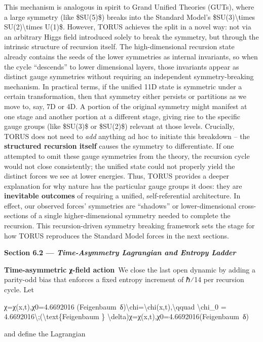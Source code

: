 This mechanism is analogous in spirit to Grand Unified Theories (GUTs),
where a large symmetry (like \$SU(5)\$) breaks into the Standard Model's
\$SU(3)\textbackslash{}times SU(2)\textbackslash{}times U(1)\$. However,
TORUS achieves the split in a novel way: not via an arbitrary Higgs
field introduced solely to break the symmetry, but through the intrinsic
structure of recursion itself​. The high-dimensional recursion state
already contains the seeds of the lower symmetries as internal
invariants, so when the cycle ``descends'' to lower dimensional layers,
those invariants appear as distinct gauge symmetries without requiring
an independent symmetry-breaking mechanism​. In practical terms, if the
unified 11D state is symmetric under a certain transformation, then that
symmetry either persists or partitions as we move to, say, 7D or 4D. A
portion of the original symmetry might manifest at one stage and another
portion at a different stage, giving rise to the specific gauge groups
(like \$SU(3)\$ or \$SU(2)\$) relevant at those levels​. Crucially,
TORUS does not need to \emph{add} anything ad hoc to initiate this
breakdown -- the \textbf{structured recursion itself} causes the
symmetry to differentiate. If one attempted to omit these gauge
symmetries from the theory, the recursion cycle would not close
consistently; the unified state could not properly yield the distinct
forces we see at lower energies​. Thus, TORUS provides a deeper
explanation for why nature has the particular gauge groups it does: they
are \textbf{inevitable outcomes} of requiring a unified,
self-referential architecture. In effect, our observed forces'
symmetries are ``shadows'' or lower-dimensional cross-sections of a
single higher-dimensional symmetry needed to complete the recursion​.
This recursion-driven symmetry breaking framework sets the stage for how
TORUS reproduces the Standard Model forces in the next sections.

\textbf{Section 6.2 --- \emph{Time-Asymmetry Lagrangian and Entropy
Ladder}}

\textbf{Time-asymmetric χ-field action} We close the last open dynamic
by adding a parity-odd bias that enforces a fixed entropy increment of
ℏ⁄14 per recursion cycle. Let

χ=χ(x,t),χ0=4.6692016  (Feigenbaum~δ)\textbackslash{}chi=\textbackslash{}chi(x,t),\textbackslash{}qquad
\textbackslash{}chi\_0 =
4.6692016\textbackslash{};(\textbackslash{}text\{Feigenbaum \}
\textbackslash{}delta)χ=χ(x,t),χ0​=4.6692016(Feigenbaum~δ)

and define the Lagrangian

